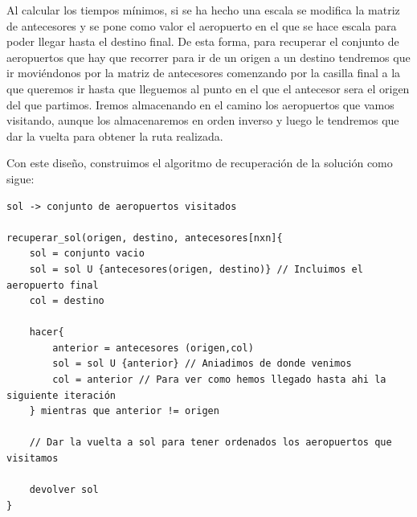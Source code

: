 Al calcular los tiempos mínimos, si se ha hecho una escala se modifica la matriz de antecesores y se pone como valor el aeropuerto en el que se hace escala para poder llegar hasta el destino final. De esta forma, para recuperar el conjunto de aeropuertos que hay que recorrer para ir de un origen a un destino tendremos que ir moviéndonos por la matriz de antecesores comenzando por la casilla final a la que queremos ir hasta que lleguemos al punto en el que el antecesor sera el origen del que partimos. Iremos almacenando en el camino los aeropuertos que vamos visitando, aunque los almacenaremos en orden inverso y luego le tendremos que dar la vuelta para obtener la ruta realizada.

Con este diseño, construimos el algoritmo de recuperación de la solución como sigue:

\begin{lstlisting}
sol -> conjunto de aeropuertos visitados

recuperar_sol(origen, destino, antecesores[nxn]{
    sol = conjunto vacio
    sol = sol U {antecesores(origen, destino)} // Incluimos el aeropuerto final
    col = destino
    
    hacer{
        anterior = antecesores (origen,col)
        sol = sol U {anterior} // Aniadimos de donde venimos
        col = anterior // Para ver como hemos llegado hasta ahi la siguiente iteración
    } mientras que anterior != origen

    // Dar la vuelta a sol para tener ordenados los aeropuertos que visitamos

    devolver sol
}
\end{lstlisting}


